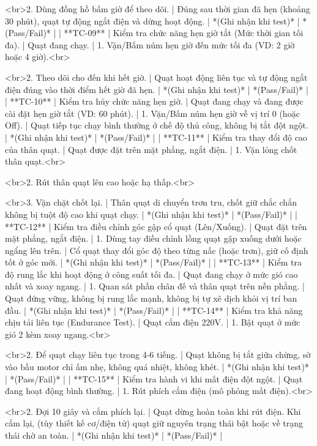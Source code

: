 <br>2. Dùng đồng hồ bấm giờ để theo dõi. | Đúng sau thời gian đã hẹn (khoảng 30 phút), quạt tự động ngắt điện và dừng hoạt động. | *(Ghi nhận khi test)* | *(Pass/Fail)* |
| **TC-09** | Kiểm tra chức năng hẹn giờ tắt (Mức thời gian tối đa). | Quạt đang chạy. | 1. Vặn/Bấm núm hẹn giờ đến mức tối đa (VD: 2 giờ hoặc 4 giờ).<br>

<br>2. Theo dõi cho đến khi hết giờ. | Quạt hoạt động liên tục và tự động ngắt điện đúng vào thời điểm hết giờ đã hẹn. | *(Ghi nhận khi test)* | *(Pass/Fail)* |
| **TC-10** | Kiểm tra hủy chức năng hẹn giờ. | Quạt đang chạy và đang được cài đặt hẹn giờ tắt (VD: 60 phút). | 1. Vặn/Bấm núm hẹn giờ về vị trí 0 (hoặc Off). | Quạt tiếp tục chạy bình thường ở chế độ thủ công, không bị tắt đột ngột. | *(Ghi nhận khi test)* | *(Pass/Fail)* |
| **TC-11** | Kiểm tra thay đổi độ cao của thân quạt. | Quạt được đặt trên mặt phẳng, ngắt điện. | 1. Vặn lỏng chốt thân quạt.<br>

<br>2. Rút thân quạt lên cao hoặc hạ thấp.<br>

<br>3. Vặn chặt chốt lại. | Thân quạt di chuyển trơn tru, chốt giữ chắc chắn không bị tuột độ cao khi quạt chạy. | *(Ghi nhận khi test)* | *(Pass/Fail)* |
| **TC-12** | Kiểm tra điều chỉnh góc gập cổ quạt (Lên/Xuống). | Quạt đặt trên mặt phẳng, ngắt điện. | 1. Dùng tay điều chỉnh lồng quạt gập xuống dưới hoặc ngẩng lên trên. | Cổ quạt thay đổi góc độ theo từng nấc (hoặc trơn), giữ cố định tốt ở góc mới. | *(Ghi nhận khi test)* | *(Pass/Fail)* |
| **TC-13** | Kiểm tra độ rung lắc khi hoạt động ở công suất tối đa. | Quạt đang chạy ở mức gió cao nhất và xoay ngang. | 1. Quan sát phần chân đế và thân quạt trên nền phẳng. | Quạt đứng vững, không bị rung lắc mạnh, không bị tự xê dịch khỏi vị trí ban đầu. | *(Ghi nhận khi test)* | *(Pass/Fail)* |
| **TC-14** | Kiểm tra khả năng chịu tải liên tục (Endurance Test). | Quạt cắm điện 220V. | 1. Bật quạt ở mức gió 2 kèm xoay ngang.<br>

<br>2. Để quạt chạy liên tục trong 4-6 tiếng. | Quạt không bị tắt giữa chừng, sờ vào bầu motor chỉ ấm nhẹ, không quá nhiệt, không khét. | *(Ghi nhận khi test)* | *(Pass/Fail)* |
| **TC-15** | Kiểm tra hành vi khi mất điện đột ngột. | Quạt đang hoạt động bình thường. | 1. Rút phích cắm điện (mô phỏng mất điện).<br>

<br>2. Đợi 10 giây và cắm phích lại. | Quạt dừng hoàn toàn khi rút điện. Khi cắm lại, (tùy thiết kế cơ/điện tử) quạt giữ nguyên trạng thái bật hoặc về trạng thái chờ an toàn. | *(Ghi nhận khi test)* | *(Pass/Fail)* |

